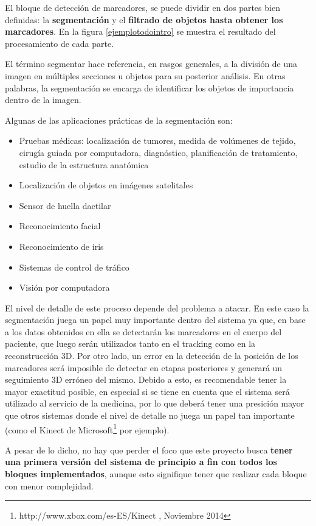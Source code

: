 El bloque de detección de marcadores, se puede dividir en dos partes bien definidas: la \textbf{segmentación} y el \textbf{filtrado de objetos hasta obtener los marcadores}. En la figura \ref{ejemplotodointro} se muestra el resultado del procesamiento de cada parte.

El término segmentar hace referencia, en rasgos generales, a la división de una imagen en múltiples secciones u objetos para su posterior análisis. En otras palabras, la segmentación se encarga de identificar los objetos de importancia dentro de la imagen. 

Algunas de las aplicaciones prácticas de la segmentación son:
\begin{itemize}
\item Pruebas médicas: localización de tumores, medida de volúmenes de tejido, cirugía guiada por computadora, diagnóstico, planificación de tratamiento, estudio de la estructura anatómica
\item Localización de objetos en imágenes satelitales
\item Sensor de  huella dactilar
\item Reconocimiento facial
\item Reconocimiento de iris
\item Sistemas de control de tráfico
\item Visión por computadora
\end{itemize}

El nivel de detalle de este proceso depende del problema a atacar. En este caso la segmentación juega un papel muy importante dentro del sistema ya que, en base a los datos obtenidos en ella se detectarán los marcadores en el cuerpo del paciente, que luego serán utilizados tanto en el tracking como en la reconstrucción 3D. Por otro lado, un error en la detección de la posición de los marcadores será imposible de detectar en etapas posteriores y generará un seguimiento 3D erróneo del mismo. Debido a esto, es recomendable tener la mayor exactitud posible, en especial si se tiene en cuenta que el sistema será utilizado al servicio de la medicina, por lo que deberá tener una presición mayor que otros sistemas donde el nivel de detalle no juega un papel tan importante (como el Kinect de Microsoft\footnote{http://www.xbox.com/es-ES/Kinect , Noviembre 2014} por ejemplo).

A pesar de lo dicho, no hay que perder el foco que este proyecto busca \textbf{tener una primera versión del sistema de principio a fin con todos los bloques implementados}, aunque esto signifique tener que realizar cada bloque con menor complejidad.

